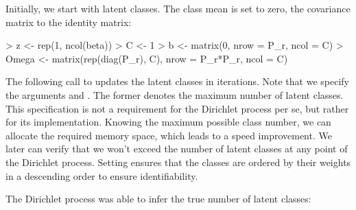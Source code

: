 \documentclass[article]{jss}
\newcommand{\fct}[1]{\code{#1()}}
\begin{document}
Initially, we start with  latent classes. The class mean  is set to zero, the covariance matrix  to the identity matrix:

\begin{Schunk}
\begin{Sinput}
> z <- rep(1, ncol(beta))
> C <- 1
> b <- matrix(0, nrow = P_r, ncol = C)
> Omega <- matrix(rep(diag(P_r), C), nrow = P_r*P_r, ncol = C)
\end{Sinput}
\end{Schunk}

The following call to \fct{update\_classes\_dp} updates the latent classes in  iterations. Note that we specify the arguments  and . The former denotes the maximum number of latent classes. This specification is not a requirement for the Dirichlet process per se, but rather for its implementation. Knowing the maximum possible class number, we can allocate the required memory space, which leads to a speed improvement. We later can verify that we won't exceed the number of  latent classes at any point of the Dirichlet process. Setting  ensures that the classes are ordered by their weights in a descending order to ensure identifiability.

\begin{Schunk}
\end{Schunk}

The Dirichlet process was able to infer the true number  of latent classes:
\end{document}
